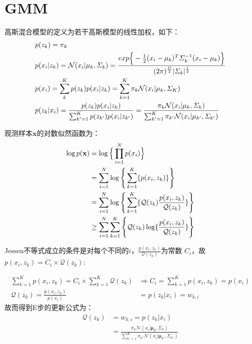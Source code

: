 
\section{GMM}

高斯混合模型的定义为若干高斯模型的线性加权，如下：
\begin{displaymath}
\begin{split}
&p(z_k)=\pi_k\\
&p(x_{i}|z_k)=\mathcal{N}(x_{i}|\mathbf{\mu}_k,\mathbf{\varSigma}_k) = 
\frac{exp\Big{\{}
-\frac{1}{2}(x_i-\mu_k)^T\varSigma_k^{-1}(x_i-\mu_k)
\Big{\}}}{(2\pi)^{\frac{D}{2}}|\varSigma_k|^{\frac{1}{2}}} 
\\
&p(x_{i})=\sum_{k}^{K}{p(z_k)}p(x_{i}|z_k)=\sum_{k=1}^{K}\pi_k\mathcal{N}(x_{i}|\mathbf{\mu}_k,\mathbf{\varSigma}_K)\\
&p(z_k|x_{i})
=\frac{p(z_k)p(x_{i}|z_k)}{\sum_{k'=1}^{K}p(z_{k'})p(x_{i}|z_{k'})} =\frac{
\pi_k\mathcal{N}(x_{i}|\mathbf{\mu}_k,\mathbf{\varSigma}_k)
}{
\sum_{k'=1}^{K}\pi_{k'}\mathcal{N}(x_{i}|\mathbf{\mu}_{k'},\mathbf{\varSigma}_{k'})
}
\end{split}
\end{displaymath}

观测样本$\mathbf{x}$的对数似然函数为：
\begin{displaymath}
\begin{split}
\log p(\mathbf{x}) &=\log \Big{\{} \prod_{i=1}^N{p(x_i)}\Big{\}}\\
&=\sum_{i=1}^{N} \log \Bigg{\{} \sum_{k=1}^{K}\{p(x_i,z_k)\}
\Bigg{\}}\\
&=\sum_{i=1}^{N} \log \Bigg{\{} \sum_{k=1}^{K}\{\mathcal{Q}(z_k)\frac{p(x_i,z_k)}{\mathcal{Q}(z_k)}\} \Bigg{\}}\\
&\geq \sum_{i=1}^{N} \sum_{k=1}^{K} \Bigg{\{}
\mathcal{Q}(z_k) \log \{ \frac{p(x_i,z_k)} {\mathcal{Q}(z_k)}  \}
\Bigg{\}}\\
\end{split}
\end{displaymath}

Jessen不等式成立的条件是对每个不同的$i$，$\frac{p(x_i,z_k)} {\mathcal{Q}(z_k)} $为常数
$C_i$，故$p(x_i,z_k) =C_i \times \mathcal{Q}(z_k)$:

\begin{displaymath}
\begin{split}
\sum_{k=1}^{K}p(x_i,z_k) =C_i \times \sum_{k=1}^{K}\mathcal{Q}(z_k)
&\Longrightarrow C_i = \sum_{k=1}^{K}p(x_i,z_k) = p(x_i) \\
\mathcal{Q}(z_k) = \frac{p(x_i,z_k)}{p(x_i)} &= p(z_k|x_i) = w_{k,i}
\end{split}
\end{displaymath}
故而得到E步的更新公式为：
\begin{displaymath}
\begin{split}
\mathcal{Q}(z_k) &= w_{k,i} = p(z_k|x_i)\\
&= \frac{
\pi_k\mathcal{N}(x_{i}|\mathbf{\mu}_k,\mathbf{\varSigma}_k)
}{
\sum_{k'=1}^{K}\pi_{k'}\mathcal{N}(x_{i}|\mathbf{\mu}_{k'},\mathbf{\varSigma}_{k'})
}
\end{split}
\end{displaymath}

